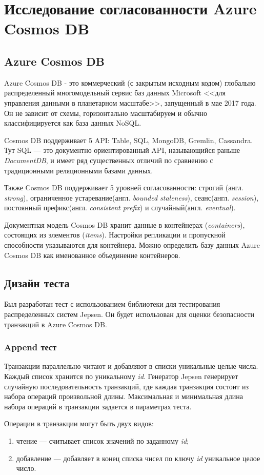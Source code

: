 \documentclass[14pt,  openany]{book}
\begin{document}
\chapter{Исследование согласованности Azure Cosmos DB}
\section{Azure Cosmos DB}
Azure Cosmos DB - это коммерческий (с закрытым исходным кодом) глобально распределенный многомодельный сервис баз данных Microsoft <<для управления данными в планетарном масштабе>>, запущенный в мае 2017 года. Он не зависит от схемы, горизонтально масштабируем и обычно классифицируется как база данных NoSQL.
\par Cosmos DB поддерживает 5 API: Table, SQL, MongoDB, Gremlin, Cassandra.  Тут SQL --- это документно ориентированный API, называющийся раньше \textit{DocumentDB}, и имеет ряд существенных отличий по сравнению с традиционными реляционными базами данных.
\par Также Cosmos DB поддерживает 5 уровней согласованности: строгий (англ.  \textit{strong}), ограниченное устаревание(англ.  \textit{bounded staleness}), сеанс(англ.  \textit{session}), постоянный префикс(англ.  \textit{consistent prefix}) и случайный(англ.  \textit{eventual}).
\par Документная модель Cosmos DB хранит данные в контейнерах (\textit{containers}), состоящих из элементов (\textit{items}). Настройки репликации и пропускной способности указываются для контейнера. Можно определить базу данных Azure Cosmos DB как именованное объединение контейнеров.

\section{Дизайн теста}
Был разработан тест с использованием библиотеки для тестирования распределенных систем Jepsen. Он будет использован для оценки безопасности транзакций в Azure Cosmos DB. 
\subsection{Append тест}
Транзакции параллельно читают и добавляют в списки уникальные целые числа. Каждый список хранится по уникальному \textit{id}.  Генератор Jepsen генерирует случайную последовательность транзакций, где каждая транзакция состоит из набора операций произвольной длины. Максимальная и минимальная длина набора операций в транзакции задается в параметрах теста. 
\par Операции в транзакции могут быть двух видов:
\begin{enumerate}
\item чтение --- считывает список значений по заданному \textit{id};
\item добавление --- добавляет в конец списка чисел по ключу \textit{id} уникальное целое число.
\end{enumerate}
\end{document}
